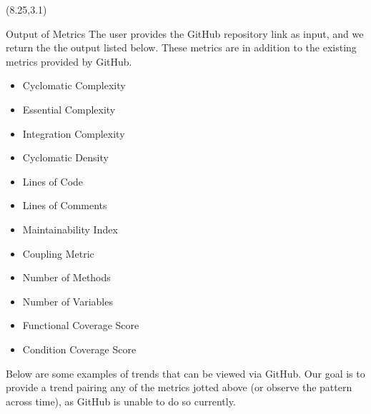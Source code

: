 \documentclass[22pt]{beamer}
\begin{document}
\begin{frame}[fragile]
\begin{textblock}{7.25}(8.25,3.1)
\begin{block}{Output of Metrics}
The user provides the GitHub repository link as input, and we return the the output listed below. These metrics are in addition to the existing metrics provided by GitHub. 
\begin{itemize}
\item Cyclomatic Complexity 
\item Essential Complexity 
\item Integration Complexity 
\item Cyclomatic Density
\item Lines of Code 
\item Lines of Comments 
\item Maintainability Index 
\item Coupling Metric 
\item Number of Methods
\item Number of Variables 
\item Functional Coverage Score
\item Condition Coverage Score 
\end{itemize}
Below are some examples of trends that can be viewed via GitHub. Our goal is to provide a trend pairing any of the metrics jotted above (or observe the pattern across time), as GitHub is unable to do so currently. 


\end{block}
\end{textblock}
\end{frame}
\end{document}
